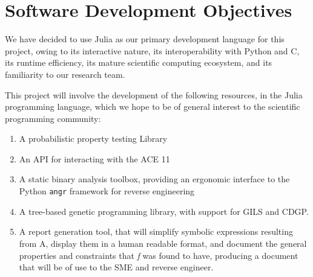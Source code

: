 \documentclass[11pt]{article}
\begin{document}
\section{Software Development Objectives}
\label{sec:orgde507df}
We have decided to use Julia as our primary development language for this project, owing to its interactive nature, its interoperability with Python and C, its runtime efficiency, its mature scientific computing ecosystem, and its familiarity to our research team.

This project will involve the development of the following resources, in the Julia programming language, which we hope to be of general interest to the scientific programming community:

\begin{enumerate}
\item A probabilistic property testing Library
\item An API for interacting with the ACE 11
\item A static binary analysis toolbox, providing an ergonomic interface to the Python \texttt{angr} framework for reverse engineering
\item A tree-based genetic programming library, with support for GILS and CDGP.
\item A report generation tool, that will simplify symbolic expressions resulting from A, display them in a human readable format, and document the general properties and constraints that \emph{f} was found to have, producing a document that will be of use to the SME and reverse engineer.
\end{enumerate}






\end{document}
